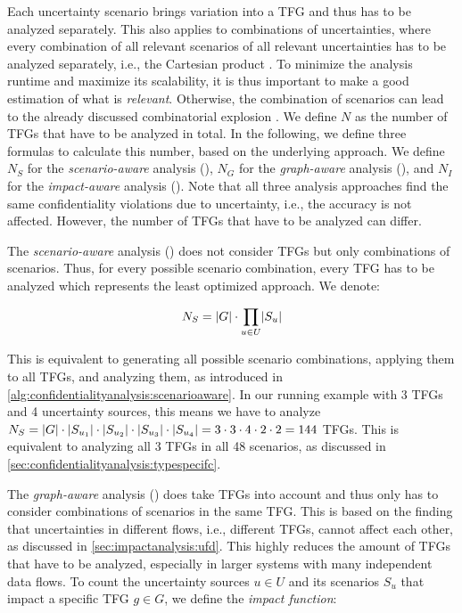 Each uncertainty scenario brings variation into a \ac{TFG} and thus has to be analyzed separately.
This also applies to combinations of uncertainties, where every combination of all relevant scenarios of all relevant uncertainties has to be analyzed separately, i.e., the Cartesian product \cite{de_finetti_theory_2017}.
To minimize the analysis runtime and maximize its scalability, it is thus important to make a good estimation of what is \emph{relevant}.
Otherwise, the combination of scenarios can lead to the already discussed combinatorial explosion \cite{koziolek_automated_2011}.
We define $N$ as the number of \acp{TFG} that have to be analyzed in total.
In the following, we define three formulas to calculate this number, based on the underlying approach.
We define $N_{S}$ for the \emph{scenario-aware} analysis (), $N_{G}$ for the \emph{graph-aware} analysis (), and $N_{I}$ for the \emph{impact-aware} analysis ().
Note that all three analysis approaches find the same confidentiality violations due to uncertainty, i.e., the accuracy is not affected.
However, the number of \acp{TFG} that have to be analyzed can differ.


The \emph{scenario-aware} analysis () does not consider \acp{TFG} but only combinations of scenarios.
Thus, for every possible scenario combination, every \ac{TFG} has to be analyzed which represents the least optimized approach.
We denote:

\begin{equation*}
N_{S} = \lvert G\rvert \cdot \prod_{u \in U} \lvert S_{u}\rvert
\end{equation*}

This is equivalent to generating all possible scenario combinations, applying them to all \acp{TFG}, and analyzing them, as introduced in \autoref{alg:confidentialityanalysis:scenarioaware}.
In our running example with 3 \acp{TFG} and 4 uncertainty sources, this means we have to analyze $N_{S} = \lvert G\rvert \cdot \lvert S_{u_{1}}\rvert \cdot \lvert S_{u_{2}}\rvert \cdot \lvert S_{u_{3}}\rvert \cdot \lvert S_{u_{4}}\rvert = 3 \cdot 3 \cdot 4 \cdot 2 \cdot 2 = 144$ \acp{TFG}.
This is equivalent to analyzing all 3 \acp{TFG} in all 48 scenarios, as discussed in \autoref{sec:confidentialityanalysis:typespecifc}.


The \emph{graph-aware} analysis () does take \acp{TFG} into account and thus only has to consider combinations of scenarios in the same \ac{TFG}.
This is based on the finding that uncertainties in different flows, i.e., different \acp{TFG}, cannot affect each other, as discussed in \autoref{sec:impactanalysis:ufd}.
This highly reduces the amount of \acp{TFG} that have to be analyzed, especially in larger systems with many independent data flows.
To count the uncertainty sources $u \in U$ and its scenarios $S_{u}$ that impact a specific TFG $g \in G$, we define the \emph{impact function}:

